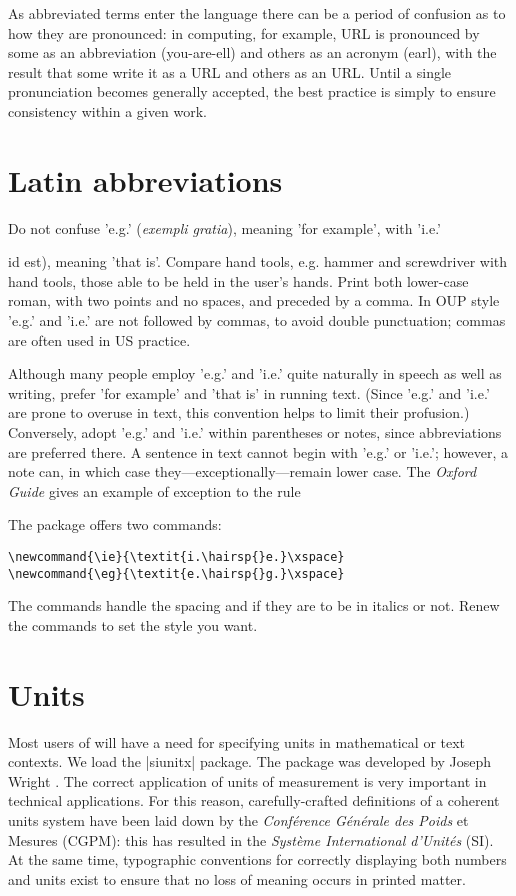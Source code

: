 As abbreviated terms enter the
language there can be a period of confusion as to how they are pronounced:
in computing, for example, \ac{URL} is
pronounced by some as an abbreviation (you-are-ell) and others as an
acronym (earl), with the result that some write it as a URL and others as
an URL. Until a single pronunciation becomes generally accepted, the
best practice is simply to ensure consistency within a given work.

\section{Latin abbreviations}

Do not confuse 'e.g.' (\emph{exempli gratia}), meaning 'for example', with 'i.e.'
{id est), meaning 'that is'. Compare hand tools, e.g. hammer and screwdriver
with hand tools, \ie those able to be held in the user's hands. Print both lower-case roman, with two points and no spaces, and preceded by a
comma. In OUP style 'e.g.' and 'i.e.' are not followed by commas, to avoid
double punctuation; commas are often used in US practice.

Although many people employ 'e.g.' and 'i.e.' quite naturally in speech
as well as writing, prefer 'for example' and 'that is' in running text.
(Since 'e.g.' and 'i.e.' are prone to overuse in text, this convention helps
to limit their profusion.) Conversely, adopt 'e.g.' and 'i.e.' within parentheses
or notes, since abbreviations are preferred there. A sentence in text cannot begin with 'e.g.' or 'i.e.'; however, a note can, in which case
they—exceptionally—remain lower case. The \textit{Oxford Guide} gives an example of exception to the rule

The package offers two commands:

\begin{verbatim}
\newcommand{\ie}{\textit{i.\hairsp{}e.}\xspace}
\newcommand{\eg}{\textit{e.\hairsp{}g.}\xspace}
\end{verbatim}

The commands handle the spacing and if they are to be in italics or not. Renew the commands to set the style you want.

\section{Units}
\label{units}

Most users of \latex will have a need for specifying units in  mathematical or text contexts. We load the |siunitx| package. The package was developed by Joseph Wright \citeyearpar{siunitx}. The correct application of units of measurement is very important in technical applications. For this reason, carefully-crafted definitions of a coherent units system have been
laid down by the \textit{Conférence Générale des Poids} et Mesures (CGPM): this has resulted in
the \textit{Système International d’Unités} (SI). At the same time, typographic conventions for
correctly displaying both numbers and units exist to ensure that no loss of meaning
occurs in printed matter.

}
